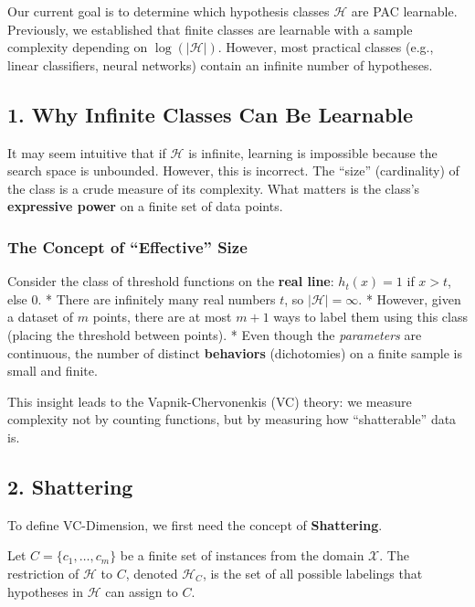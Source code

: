 \documentclass[
  italian,
  11pt,
]{article}
\begin{document}
Our current goal is to determine which hypothesis classes
\(\mathcal{H}\) are PAC learnable. Previously, we established that
finite classes are learnable with a sample complexity depending on
\(\log(|\mathcal{H}|)\). However, most practical classes (e.g., linear
classifiers, neural networks) contain an infinite number of hypotheses.

\subsection{1. Why Infinite Classes Can Be
Learnable}\label{why-infinite-classes-can-be-learnable}

It may seem intuitive that if \(\mathcal{H}\) is infinite, learning is
impossible because the search space is unbounded. However, this is
incorrect. The ``size'' (cardinality) of the class is a crude measure of
its complexity. What matters is the class's \textbf{expressive power} on
a finite set of data points.

\subsubsection{The Concept of ``Effective''
Size}\label{the-concept-of-effective-size}

Consider the class of threshold functions on the \textbf{real line}:
\(h_t(x) = 1\) if \(x > t\), else \(0\). * There are infinitely many
real numbers \(t\), so \(|\mathcal{H}| = \infty\). * However, given a
dataset of \(m\) points, there are at most \(m+1\) ways to label them
using this class (placing the threshold between points). * Even though
the \emph{parameters} are continuous, the number of distinct
\textbf{behaviors} (dichotomies) on a finite sample is small and finite.

This insight leads to the Vapnik-Chervonenkis (VC) theory: we measure
complexity not by counting functions, but by measuring how
``shatterable'' data is.

\subsection{2. Shattering}\label{shattering}

To define VC-Dimension, we first need the concept of
\textbf{Shattering}.

Let \(C = \{c_1, \dots, c_m\}\) be a finite set of instances from the
domain \(\mathcal{X}\). The restriction of \(\mathcal{H}\) to \(C\),
denoted \(\mathcal{H}_C\), is the set of all possible labelings that
hypotheses in \(\mathcal{H}\) can assign to \(C\).
\end{document}
